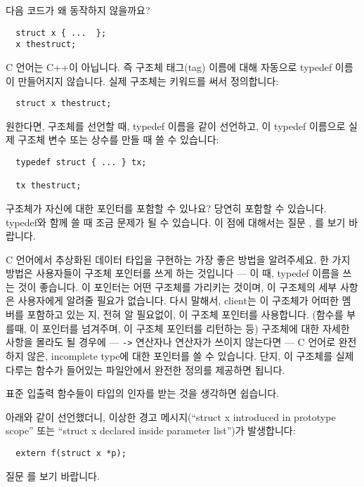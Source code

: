 \begin{faq}
	다음 코드가 왜 동작하지 않을까요?

\begin{verbatim}
  struct x { ...  };
  x thestruct;
\end{verbatim}

\A
	C 언어는 C++이 아닙니다.  즉 구조체 태그(tag) 이름에 대해 자동으로
	typedef 이름이 만들어지지 않습니다. 실제 구조체는 
        키워드를 써서 정의합니다:
\begin{verbatim}
  struct x thestruct;
\end{verbatim}
        원한다면, 구조체를 선언할 때, typedef 이름을 같이 선언하고, 이 typedef 이름으로
        실제 구조체 변수 또는 상수를 만들 때 쓸 수 있습니다:
\begin{verbatim}
  typedef struct { ... } tx;
  
  tx thestruct;
\end{verbatim}
\end{faq}

\begin{faq}
	구조체가 자신에 대한 포인터를 포함할 수 있나요?
\A
	당연히 포함할 수 있습니다. typedef와 함께 쓸 때 조금 문제가 될 수 있습니다.
        이 점에 대해서는 질문 , 를 보기 바랍니다.
\end{faq}

\begin{faq}
	C 언어에서 추상화된 데이터 타입을 구현하는 가장 좋은 방법을
	알려주세요.
\A
	한 가지 방법은 사용자들이 구조체 포인터를 쓰게 하는 것입니다 ---
	이 때, typedef 이름을 쓰는 것이 좋습니다.  이 포인터는 어떤 구조체를
	가리키는 것이며, 이 구조체의 세부 사항은 사용자에게 알려줄 필요가
	없습니다.
        다시 말해서, client는 이 구조체가 어떠한 멤버를 포함하고 있는 지, 전혀
        알 필요없이, 이 구조체 포인터를 사용합니다. (함수를 부를때,
        이 포인터를 넘겨주며, 이 구조체 포인터를 리턴하는 등)
        구조체에 대한 자세한 사항을 몰라도 될 경우에 --- \verb+->+ 연산자나
         연산자가 쓰이지 않는다면 --- C 언어로 완전하지 않은,
        incomplete type에 대한 포인터를 쓸 수 있습니다. 단지, 이 구조체를
        실제 다루는 함수가 들어있는 파일안에서 완전한 정의를 제공하면 됩니다.

\T
	표준 입출력 함수들이  타입의 인자를
	받는 것을 생각하면 쉽습니다.
\end{faq}

\begin{faq}
        아래와 같이 선언했더니, 이상한 경고 메시지(``struct x introduced in
        prototype scope'' 또는 ``struct x declared inside parameter list'')가
        발생합니다:
\begin{verbatim}
  extern f(struct x *p);
\end{verbatim}
\A
        질문 를 보기 바랍니다.
\end{faq}

